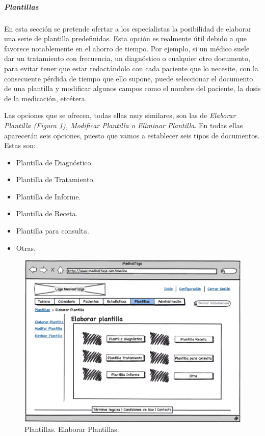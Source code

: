 		
		\bigskip
		\medskip
		\subparagraph{Plantillas} %
		\label{par:medico_plantillas}
		
		En esta sección se pretende ofertar a los especialistas la posibilidad de elaborar una serie de plantilla predefinidas. Esta opción es realmente útil debido a que favorece notablemente en el ahorro de tiempo. Por ejemplo, si un médico suele dar un tratamiento con frecuencia, un diagnóstico o cualquier otro documento, para evitar tener que estar redactándolo con cada paciente que lo necesite, con la consecuente pérdida de tiempo que ello supone, puede seleccionar el documento de una plantilla y modificar algunos campos como el nombre del paciente, la dosis de la medicación, etcétera.
		
		Las opciones que se ofrecen, todas ellas muy similares, son las de \textit{Elaborar Plantilla (Figura \ref{fig:plantillas_medico}), Modificar Plantilla o Eliminar Plantilla}. En todas ellas aparecerán seis opciones, puesto que vamos a establecer seis tipos de documentos. Estas son:
		
		\begin{itemize}
			\item Plantilla de Diagnóstico.
			\item Plantilla de Tratamiento.
			\item Plantilla de Informe.
			\item Plantilla de Receta.
			\item Plantilla para consulta.
			\item Otras.
		\end{itemize}
		
		\begin{figure}[H]
		  \centering
		    \includegraphics[width=12cm]{img/eps/18_Plantillas_Medico.eps}
		  \caption{Plantillas. Elaborar Plantillas.}
		  \label{fig:plantillas_medico}
		\end{figure}
		
